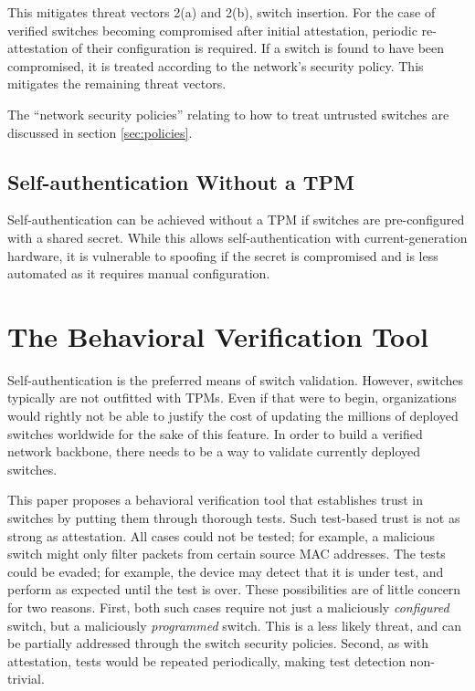 \documentclass[journal]{IEEEtran}
\begin{document}
This mitigates threat vectors 2(a) and 2(b), switch insertion. For the case of verified switches
becoming compromised after initial attestation, periodic re-attestation of their configuration is
required. If a switch is found to have been compromised, it is treated according to the network's
security policy. This mitigates the remaining threat vectors.

The ``network security policies'' relating to how to treat untrusted switches are discussed in
section \ref{sec:policies}.

\subsection{Self-authentication Without a TPM}
Self-authentication can be achieved without a TPM if switches are pre-configured with a shared
secret. While this allows self-authentication with current-generation hardware, it is vulnerable
to spoofing if the secret is compromised and is less automated as it requires manual configuration.



\section{The Behavioral Verification Tool}
Self-authentication is the preferred means of switch validation. However, switches typically are
not outfitted with TPMs. Even if that were to begin, organizations would rightly not be able to
justify the cost of updating the millions of deployed switches worldwide for the sake of this
feature. In order to build a verified network backbone, there needs to be a way to validate
currently deployed switches.

This paper proposes a behavioral verification tool that establishes trust in switches by putting
them through thorough tests. Such test-based trust is not as strong as attestation. All cases could
not be tested; for example, a malicious switch might only filter packets from certain source MAC
addresses. The tests could be evaded; for example, the device may detect that it is under test, and
perform as expected until the test is over. These possibilities are of little concern for two
reasons. First, both such cases require not just a maliciously \textit{configured} switch, but a
maliciously \textit{programmed} switch. This is a less likely threat, and can be partially
addressed through the switch security policies. Second, as with attestation, tests would be
repeated periodically, making test detection non-trivial.
\end{document}

